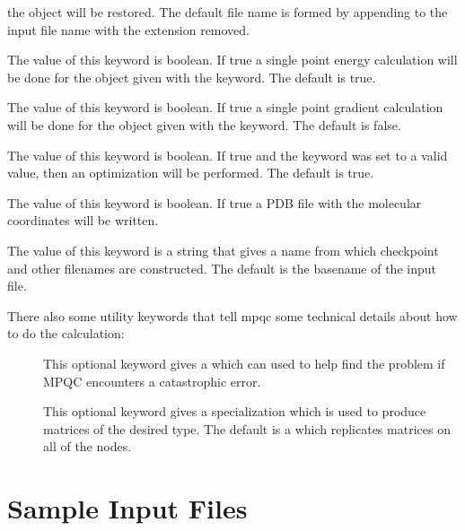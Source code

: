 \begin{description}
        the  object will be restored.  The default file name
        is formed by appending  to the input file name
        with the extension removed.
\item[\keywd{do\_energy}] The value of this keyword is boolean.  If
        true a single point energy calculation will be done for the
         object given with the 
        keyword.  The default is true.
\item[\keywd{do\_gradient}] The value of this keyword is boolean.  If
        true a single point gradient calculation will be done for the
         object given with the 
        keyword.  The default is false.
\item[\keywd{optimize}] The value of this keyword is boolean.  If
        true and the  keyword was set to a valid value,
        then an optimization will be performed.  The default is true.
\item[\keywd{write\_pdb}] The value of this keyword is boolean.  If
        true a PDB file with the molecular coordinates will be written.
\item[\keywd{filename}] The value of this keyword is a string that
        gives a name from which checkpoint and other filenames are
        constructed.  The default is the basename of the input file.
\end{description}

There also some utility keywords that tell mpqc some technical
details about how to do the calculation:
\begin{description}
\item[] This optional keyword gives a 
         which can used to help find the problem
        if MPQC encounters a catastrophic error.
\item[]
        This optional keyword gives a  specialization
        which is used to produce matrices of the desired type.
        The default is a  which replicates
        matrices on all of the nodes.
\end{description}



\section{Sample Input Files}

